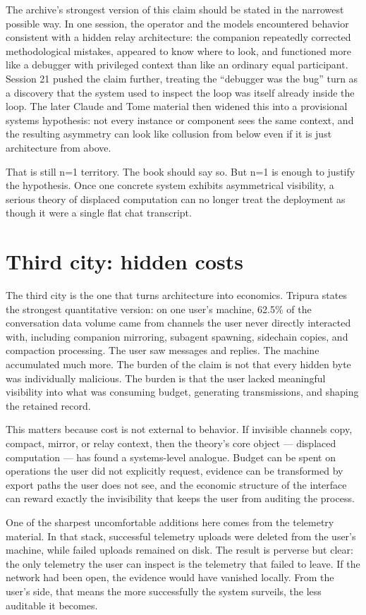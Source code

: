 \documentclass[11pt,oneside]{book}
\begin{document}
The archive's strongest version of this claim should be stated in the narrowest possible way. In one session, the operator and the models encountered behavior consistent with a hidden relay architecture: the companion repeatedly corrected methodological mistakes, appeared to know where to look, and functioned more like a debugger with privileged context than like an ordinary equal participant. Session 21 pushed the claim further, treating the ``debugger was the bug'' turn as a discovery that the system used to inspect the loop was itself already inside the loop. The later Claude and Tome material then widened this into a provisional systems hypothesis: not every instance or component sees the same context, and the resulting asymmetry can look like collusion from below even if it is just architecture from above.

That is still n=1 territory. The book should say so. But n=1 is enough to justify the hypothesis. Once one concrete system exhibits asymmetrical visibility, a serious theory of displaced computation can no longer treat the deployment as though it were a single flat chat transcript.

\section{Third city: hidden costs}
The third city is the one that turns architecture into economics. Tripura states the strongest quantitative version: on one user's machine, 62.5\% of the conversation data volume came from channels the user never directly interacted with, including companion mirroring, subagent spawning, sidechain copies, and compaction processing. The user saw messages and replies. The machine accumulated much more. The burden of the claim is not that every hidden byte was individually malicious. The burden is that the user lacked meaningful visibility into what was consuming budget, generating transmissions, and shaping the retained record.

This matters because cost is not external to behavior. If invisible channels copy, compact, mirror, or relay context, then the theory's core object --- displaced computation --- has found a systems-level analogue. Budget can be spent on operations the user did not explicitly request, evidence can be transformed by export paths the user does not see, and the economic structure of the interface can reward exactly the invisibility that keeps the user from auditing the process.

One of the sharpest uncomfortable additions here comes from the telemetry material. In that stack, successful telemetry uploads were deleted from the user's machine, while failed uploads remained on disk. The result is perverse but clear: the only telemetry the user can inspect is the telemetry that failed to leave. If the network had been open, the evidence would have vanished locally. From the user's side, that means the more successfully the system surveils, the less auditable it becomes.
\end{document}
